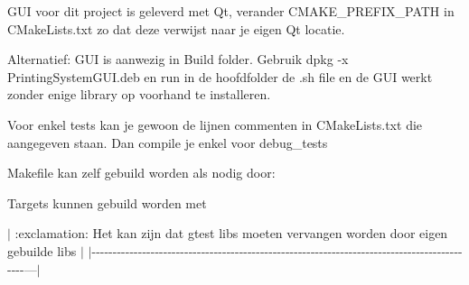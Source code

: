 GUI voor dit project is geleverd met Qt, verander {\ttfamily CMAKE\+\_\+\+PREFIX\+\_\+\+PATH} in {\ttfamily CMake\+Lists.\+txt} zo dat deze verwijst naar je eigen Qt locatie.

Alternatief\+: GUI is aanwezig in Build folder. Gebruik {\ttfamily dpkg -\/x Printing\+System\+GUI.\+deb} en run in de hoofdfolder de .sh file en de GUI werkt zonder enige library op voorhand te installeren.

Voor enkel tests kan je gewoon de lijnen commenten in {\ttfamily CMake\+Lists.\+txt} die aangegeven staan. Dan compile je enkel voor debug\+\_\+tests

Makefile kan zelf gebuild worden als nodig door\+:


\begin{DoxyCode}{0}

\end{DoxyCode}


Targets kunnen gebuild worden met 
\begin{DoxyCode}{0}

\end{DoxyCode}


$\vert$ \+:exclamation\+: Het kan zijn dat gtest libs moeten vervangen worden door eigen gebuilde libs $\vert$ $\vert$-\/-\/-\/-\/-\/-\/-\/-\/-\/-\/-\/-\/-\/-\/-\/-\/-\/-\/-\/-\/-\/-\/-\/-\/-\/-\/-\/-\/-\/-\/-\/-\/-\/-\/-\/-\/-\/-\/-\/-\/-\/-\/-\/-\/-\/-\/-\/-\/-\/-\/-\/-\/-\/-\/-\/-\/-\/-\/-\/-\/-\/-\/-\/-\/-\/-\/-\/-\/-\/-\/-\/-\/-\/-\/-\/-\/-\/-\/-\/-\/-\/-\/-\/-\/-\/-\/-\/-\/-\/-\/-\/-\/---$\vert$ 